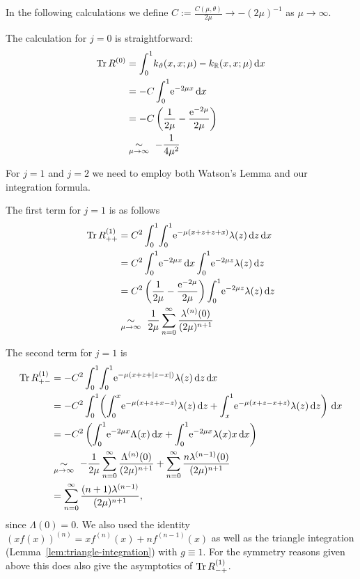 In the following calculations we define $C := \frac{C(\mu,\theta)}{2\mu} \to
-(2\mu)^{-1}$ as $\mu\to\infty$.

The calculation for $j=0$ is straightforward:
\begin{align}
  \Tr R^{(0)} &= \Int{x}{k_\theta(x,x;\mu) - k_\mathbb{R}(x,x;\mu)} \\
              &= -C \Int{x}{\Eto{-2\mu x}} \\
              &= -C \left(
                \frac1{2\mu} - \frac{\Eto{-2\mu}}{2\mu}
                \right) \\
              &\SimAs{\mu\to\infty}\ -\frac1{4\mu^2}
  \label{eqn:jeq0}
\end{align}

For $j=1$ and $j=2$ we need to employ both Watson's Lemma and our integration
formula.

The first term for $j=1$ is as follows
\begin{align*}
  \Tr R^{(1)}_{++} &= C^2 \Int{x}{
    \Int{z}{
      \Eto{-\mu(x+z+z+x)}\lambda(z)
    }
  } \\
  &= C^2 \Int{x}{
    \Eto{-2\mu x}
  }
  \Int{z}{
    \Eto{-2\mu z}\lambda(z)
  } \\
  &= C^2 \left(
      \frac1{2\mu} - \frac{\Eto{-2\mu}}{2\mu}
    \right)
    \Int{z}{\Eto{-2\mu z}\lambda(z)} \\
  &\SimAs{\mu\to\infty}\ %
  \frac{1}{2\mu} \Wsum{\lambda^{(n)}(0)}
\end{align*}

The second term for $j=1$ is
\begin{align*}
  \Tr R^{(1)}_{+-} &= -C^2 \Int{x}{
      \Int{z}{
        \Eto{-\mu(x+z+\Abs{z-x})}
        \lambda(z)
      }
    } \\
    &= -C^2 \Int{x}{
      \left(
        \Integ[x]{0}{z}{
          \Eto{-\mu(x+z+x-z)}\lambda(z)
        }
      + \Integ[1]{x}{z}{
          \Eto{-\mu(x+z-x+z)} \lambda(z)
        }
      \right)
    } \\
    &= -C^2 \left(
      \Int{x}{\Eto{-2\mu x} \Lambda(x)}
      + \Int{x}{\Eto{-2\mu x} \lambda(x)x}
      \right) \\
    &\SimAs{\mu\to\infty}\ %
      -\frac{1}{2\mu}
      \Wsum{\Lambda^{(n)}(0)} + \Wsum{n\lambda^{(n-1)}(0)} \\
    &= \Wsum{(n+1)\lambda^{(n-1)}},
\end{align*}
since $\Lambda(0) = 0$. We also used the identity $(xf(x))^{(n)} = xf^{(n)}(x) +
nf^{(n-1)}(x)$ as well as the triangle integration
(Lemma~\ref{lem:triangle-integration}) with $g \equiv 1$.
For the symmetry reasons given above this does also give the asymptotics of $\operatorname{Tr}
R^{(1)}_{-+}$.


